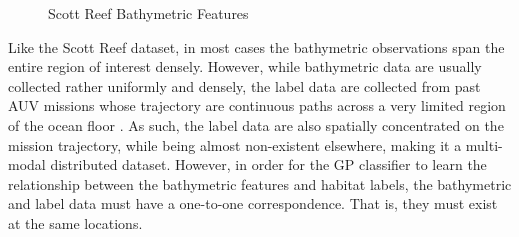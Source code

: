 			\begin{figure}[!htbp]
			\centering
			\caption{Scott Reef Bathymetric Features}
			\label{Figure:ScottReefBathymetricFeatures}
			\end{figure}
			
			
			Like the Scott Reef dataset, in most cases the bathymetric observations span the entire region of interest densely. However, while bathymetric data are usually collected rather uniformly and densely, the label data are collected from past AUV missions whose trajectory are continuous paths across a very limited region of the ocean floor \citep{Squidle}. As such, the label data are also spatially concentrated on the mission trajectory, while being almost non-existent elsewhere, making it a multi-modal distributed dataset. However, in order for the GP classifier to learn the relationship between the bathymetric features and habitat labels, the bathymetric and label data must have a one-to-one correspondence. That is, they must exist at the same locations. 
			
